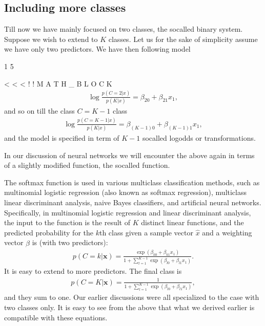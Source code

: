 \documentclass[letterpaper,10pt,english]{sphinxmanual}
\begin{document}
\subsection{Including more classes}
\label{\detokenize{chapter5:including-more-classes}}
Till now we have mainly focused on two classes, the so\sphinxhyphen{}called binary
system. Suppose we wish to extend to \(K\) classes.  Let us for the sake
of simplicity assume we have only two predictors. We have then
following model

1
5

\textless{}
\textless{}
\textless{}
!
!
M
A
T
H
\_
B
L
O
C
K
\begin{equation*}
\begin{split}
\log{\frac{p(C=2\vert x)}{p(K\vert x)}} = \beta_{20}+\beta_{21}x_1,
\end{split}
\end{equation*}
and so on till the class \(C=K-1\) class
\begin{equation*}
\begin{split}
\log{\frac{p(C=K-1\vert x)}{p(K\vert x)}} = \beta_{(K-1)0}+\beta_{(K-1)1}x_1,
\end{split}
\end{equation*}
and the model is specified in term of \(K-1\) so\sphinxhyphen{}called log\sphinxhyphen{}odds or
 transformations.

In our discussion of neural networks we will encounter the above again
in terms of a slightly modified function, the so\sphinxhyphen{}called  function.

The softmax function is used in various multiclass classification
methods, such as multinomial logistic regression (also known as
softmax regression), multiclass linear discriminant analysis, naive
Bayes classifiers, and artificial neural networks.  Specifically, in
multinomial logistic regression and linear discriminant analysis, the
input to the function is the result of \(K\) distinct linear functions,
and the predicted probability for the \(k\)\sphinxhyphen{}th class given a sample
vector \(\hat{x}\) and a weighting vector \(\hat{\beta}\) is (with two
predictors):
\begin{equation*}
\begin{split}
p(C=k\vert \mathbf {x} )=\frac{\exp{(\beta_{k0}+\beta_{k1}x_1)}}{1+\sum_{l=1}^{K-1}\exp{(\beta_{l0}+\beta_{l1}x_1)}}.
\end{split}
\end{equation*}
It is easy to extend to more predictors. The final class is
\begin{equation*}
\begin{split}
p(C=K\vert \mathbf {x} )=\frac{1}{1+\sum_{l=1}^{K-1}\exp{(\beta_{l0}+\beta_{l1}x_1)}},
\end{split}
\end{equation*}
and they sum to one. Our earlier discussions were all specialized to
the case with two classes only. It is easy to see from the above that
what we derived earlier is compatible with these equations.
\end{document}
